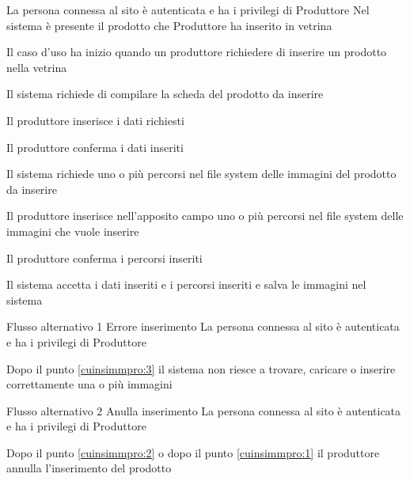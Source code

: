 \tabcuvspace

{}
{La persona connessa al sito è autenticata e ha i privilegi di Produttore}
{Nel sistema è presente il prodotto che Produttore ha inserito in vetrina}
{\begin{enumCU}
		\item Il caso d'uso ha inizio quando un produttore richiedere di inserire un prodotto nella vetrina
		\item Il sistema richiede di compilare la scheda del prodotto da inserire
		\item Il produttore inserisce i dati richiesti \label{cuinsimmpro:1}
		\item Il produttore conferma i dati inseriti 
		\item Il sistema richiede uno o più percorsi nel file system delle immagini del prodotto da inserire
		\item Il produttore inserisce nell'apposito campo uno o più percorsi nel file system delle immagini che vuole inserire \label{cuinsimmpro:2}
		\item Il produttore conferma i percorsi inseriti \label{cuinsimmpro:3}
		\item Il sistema accetta i dati inseriti e i percorsi inseriti e salva le immagini nel sistema
	\end{enumCU}}
%
{Flusso alternativo 1}%
{Errore inserimento}%
{La persona connessa al sito è autenticata e ha i privilegi di Produttore}%
{\postNulle}%
{\begin{enumCU}
		\item Dopo il punto \ref{cuinsimmpro:3} il sistema non riesce a trovare, caricare o inserire correttamente una o più immagini
	\end{enumCU}}%
%
{Flusso alternativo 2}%
{Anulla inserimento}%
{La persona connessa al sito è autenticata e ha i privilegi di Produttore}%
{\postNulle}%
{\begin{enumCU}
		\item Dopo il punto \ref{cuinsimmpro:2} o dopo il punto \ref{cuinsimmpro:1} il produttore annulla l'inserimento del prodotto
	\end{enumCU}}%

\tabcuvspace

